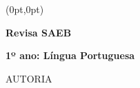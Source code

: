 





\begingroup\thispagestyle{empty}

\begin{textblock*}{2.625in}(0pt,0pt)%
\vspace*{-3.5cm}
\hspace*{-4cm}%
\end{textblock*}
                
              \vspace*{\fill}
              \begin{center}
              {\HUGE\textbf{Revisa SAEB}}\bigskip

              {\LARGE\textbf{1º ano: Língua Portuguesa}}

              \bigskip
              \bigskip
              \bigskip

              {\Large
                            AUTORIA

                            }
              \end{center}
              \vspace*{\fill}

\endgroup
\pagebreak